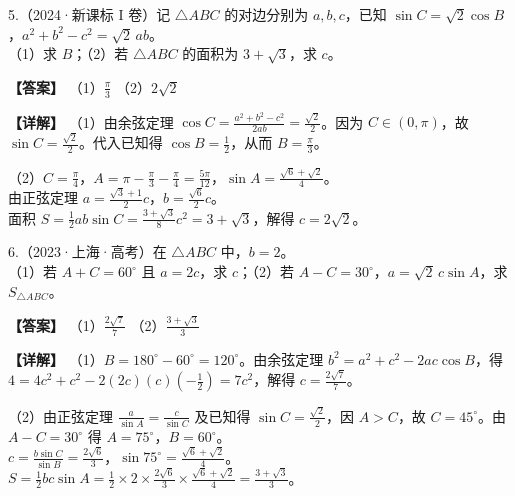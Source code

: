 \documentclass[UTF8,10pt,aspectratio=169]{ctexbeamer}
\begin{document}
	\begin{frame}
		5.（2024·新课标 I 卷）记 $\triangle ABC$ 的对边分别为 $a, b, c$，已知 $\sin C = \sqrt{2}\cos B$，$a^2 + b^2 - c^2 = \sqrt{2}\,ab$。\\
		（1）求 $B$；\quad （2）若 $\triangle ABC$ 的面积为 $3 + \sqrt{3}$，求 $c$。
		
		\vspace{0.3cm}
		\pause
		\textbf{【答案】} （1）$\frac{\pi}{3}$ \quad （2）$2\sqrt{2}$
		
		\vspace{0.2cm}
		\textbf{【详解】} 
		（1）由余弦定理 $\cos C = \frac{a^2+b^2-c^2}{2ab} = \frac{\sqrt{2}}{2}$。因为 $C \in (0, \pi)$，故 $\sin C = \frac{\sqrt{2}}{2}$。代入已知得 $\cos B = \frac{1}{2}$，从而 $B = \frac{\pi}{3}$。
		
		（2）$C = \frac{\pi}{4}$，$A = \pi - \frac{\pi}{3} - \frac{\pi}{4} = \frac{5\pi}{12}$，$\sin A = \frac{\sqrt{6}+\sqrt{2}}{4}$。\\
		由正弦定理 $a = \frac{\sqrt{3}+1}{2}c$，$b = \frac{\sqrt{6}}{2}c$。\\
		面积 $S = \frac{1}{2}ab\sin C = \frac{3+\sqrt{3}}{8}c^2 = 3+\sqrt{3}$，解得 $c = 2\sqrt{2}$。
	\end{frame}
	
	\begin{frame}
		6.（2023·上海·高考）在 $\triangle ABC$ 中，$b = 2$。\\
		（1）若 $A + C = 60^\circ$ 且 $a = 2c$，求 $c$；\quad （2）若 $A - C = 30^\circ$，$a = \sqrt{2}\,c\sin A$，求 $S_{\triangle ABC}$。
		
		\vspace{0.3cm}
		\pause
		\textbf{【答案】} （1）$\frac{2\sqrt{7}}{7}$ \quad （2）$\frac{3+\sqrt{3}}{3}$
		
		\vspace{0.2cm}
		\textbf{【详解】} 
		（1）$B = 180^\circ - 60^\circ = 120^\circ$。由余弦定理 $b^2 = a^2 + c^2 - 2ac\cos B$，得 $4 = 4c^2 + c^2 - 2(2c)(c)(-\frac{1}{2}) = 7c^2$，解得 $c = \frac{2\sqrt{7}}{7}$。
		
		（2）由正弦定理 $\frac{a}{\sin A} = \frac{c}{\sin C}$ 及已知得 $\sin C = \frac{\sqrt{2}}{2}$，因 $A>C$，故 $C=45^\circ$。由 $A-C=30^\circ$ 得 $A=75^\circ$，$B=60^\circ$。\\
		$c = \frac{b\sin C}{\sin B} = \frac{2\sqrt{6}}{3}$，$\sin 75^\circ = \frac{\sqrt{6}+\sqrt{2}}{4}$。\\
		$S = \frac{1}{2}bc\sin A = \frac{1}{2} \times 2 \times \frac{2\sqrt{6}}{3} \times \frac{\sqrt{6}+\sqrt{2}}{4} = \frac{3+\sqrt{3}}{3}$。
	\end{frame}
	
\end{document}
